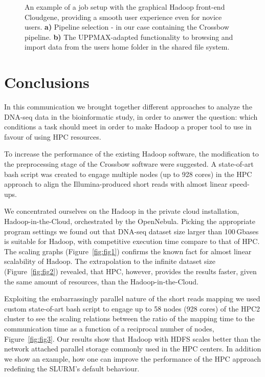 \documentclass[11pt, oneside]{article}   	%
\begin{document}
\begin{figure}
\begin{subfigure}[b]{0.6\textwidth}
		\subcaption{}
	\end{subfigure}
	\caption{An example of a job setup with the graphical Hadoop front-end Cloudgene, providing a smooth user experience even for novice users. \textbf{a)} Pipeline selection - in our case containing the Crossbow pipeline. \textbf{b)} The UPPMAX-adapted functionality to browsing and import data from the users home folder in the shared file system.}
	\label{fig:fig4}
\end{figure}


\section{Conclusions}
\label{sectionV}

In this communication we brought together different approaches to analyze  the DNA-seq data in the bioinformatic study, in order to answer the question: which conditions a task should meet in order to make Hadoop a proper tool to use in favour of using HPC resources. 

To increase the performance of the existing Hadoop software, the modification to the preprocessing stage of the Crossbow software were suggested.  A state-of-art bash script was created to engage multiple nodes (up to 928 cores) in the HPC approach to align the Illumina-produced short reads with almost linear speed-ups.

We concentrated ourselves on the Hadoop  in the private cloud installation, Hadoop-in-the-Cloud, orchestrated by the OpenNebula. 
Picking the appropriate program settings we found out that DNA-seq dataset size larger than 100\,Gbases is suitable for Hadoop, with competitive  execution time compare to  that of HPC.
The scaling graphs (Figure~\ref{fig:fig1}) confirms the known fact for almost linear scalability of Hadoop.
The extrapolation to the infinite dataset size (Figure~\ref{fig:fig2}) revealed, that HPC, however, provides the results faster, given the same amount of resources, than the Hadoop-in-the-Cloud. 

Exploiting  the embarrassingly parallel nature of the short reads mapping we used custom state-of-art bash script to engage up to 58 nodes (928 cores) of the HPC2 cluster to  see the scaling relations between the ratio of the mapping time to the communication time as a function of a reciprocal number of nodes, Figure~\ref{fig:fig3}. 
Our results show that Hadoop with HDFS scales better than the network attached parallel storage commonly used in the HPC centers.
In addition we show  an example, how one can improve the performance of the HPC approach redefining the SLURM's default behaviour.
\end{document}
